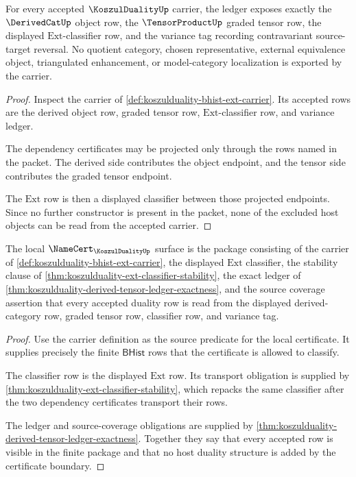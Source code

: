 \begin{theorem}
\label{thm:koszulduality-derived-tensor-ledger-exactness}
For every accepted $\KoszulDualityUp$ carrier, the ledger exposes exactly the
$\DerivedCatUp$ object row, the $\TensorProductUp$ graded tensor row, the
displayed $\mathrm{Ext}$-classifier row, and the variance tag recording
contravariant source-target reversal. No quotient category, chosen
representative, external equivalence object, triangulated enhancement, or
model-category localization is exported by the carrier.
\end{theorem}
\begin{proof}
Inspect the carrier of
\autoref{def:koszulduality-bhist-ext-carrier}. Its accepted rows are the
derived object row, graded tensor row, $\mathrm{Ext}$-classifier row, and
variance ledger.

The dependency certificates may be projected only through the rows named in
the packet. The derived side contributes the object endpoint, and the tensor
side contributes the graded tensor endpoint.

The $\mathrm{Ext}$ row is then a displayed classifier between those projected
endpoints. Since no further constructor is present in the packet, none of the
excluded host objects can be read from the accepted carrier.
\end{proof}

\begin{theorem}
\label{thm:koszulduality-namecert-obligation-surface}
The local $\NameCert_{\KoszulDualityUp}$ surface is the package consisting of
the carrier of \autoref{def:koszulduality-bhist-ext-carrier}, the displayed
$\mathrm{Ext}$ classifier, the stability clause of
\autoref{thm:koszulduality-ext-classifier-stability}, the exact ledger of
\autoref{thm:koszulduality-derived-tensor-ledger-exactness}, and the source
coverage assertion that every accepted duality row is read from the displayed
derived-category row, graded tensor row, classifier row, and variance tag.
\end{theorem}
\begin{proof}
Use the carrier definition as the source predicate for the local certificate.
It supplies precisely the finite $\mathsf{BHist}$ rows that the certificate is
allowed to classify.

The classifier row is the displayed $\mathrm{Ext}$ row. Its transport
obligation is supplied by
\autoref{thm:koszulduality-ext-classifier-stability}, which repacks the same
classifier after the two dependency certificates transport their rows.

The ledger and source-coverage obligations are supplied by
\autoref{thm:koszulduality-derived-tensor-ledger-exactness}. Together they say
that every accepted row is visible in the finite package and that no host
duality structure is added by the certificate boundary.
\end{proof}

